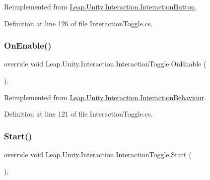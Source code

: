 Reimplemented from \mbox{\hyperlink{class_leap_1_1_unity_1_1_interaction_1_1_interaction_button_a678babacbcc3d91d865ea76462a30aec}{Leap.\+Unity.\+Interaction.\+Interaction\+Button}}.



Definition at line 126 of file Interaction\+Toggle.\+cs.

\mbox{\label{class_leap_1_1_unity_1_1_interaction_1_1_interaction_toggle_ac5a6bd9608c07270d3ef41feb0913bba}} 
\subsubsection{\texorpdfstring{OnEnable()}{OnEnable()}}
{\footnotesize\ttfamily override void Leap.\+Unity.\+Interaction.\+Interaction\+Toggle.\+On\+Enable (\begin{DoxyParamCaption}{ }\end{DoxyParamCaption})\hspace{0.3cm}{\ttfamily [protected]}, {\ttfamily [virtual]}}



Reimplemented from \mbox{\hyperlink{class_leap_1_1_unity_1_1_interaction_1_1_interaction_behaviour_af4b5101862906b5d2c7da28136778a8f}{Leap.\+Unity.\+Interaction.\+Interaction\+Behaviour}}.



Definition at line 121 of file Interaction\+Toggle.\+cs.

\mbox{\label{class_leap_1_1_unity_1_1_interaction_1_1_interaction_toggle_ab72d4861fbce848ae802d990917ee50e}} 
\subsubsection{\texorpdfstring{Start()}{Start()}}
{\footnotesize\ttfamily override void Leap.\+Unity.\+Interaction.\+Interaction\+Toggle.\+Start (\begin{DoxyParamCaption}{ }\end{DoxyParamCaption})\hspace{0.3cm}{\ttfamily [protected]}, {\ttfamily [virtual]}}



